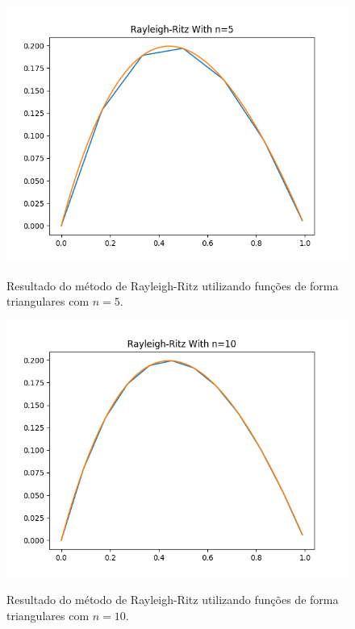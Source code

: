 \documentclass[
	12pt,				%
	openright,			%
    twoside,			%
	a4paper,			%
	english,			%
	french,				%
	spanish,			%
	brazil				%
	]{abntex2}
\numberwithin{lema}{chapter}
\numberwithin{teorema}{chapter}
\numberwithin{definicao}{chapter}
\numberwithin{exemplo}{chapter}
\numberwithin{figure}{chapter}
\begin{document}
\begin{figure}[h]
	\caption{Resultado do método de Rayleigh-Ritz utilizando funções de forma triangulares com $n=5$.}
	\centering
	\includegraphics[scale=0.6]{../figuras/code/code_plot_mrr_triangulate.png}
	\label{fig:code_plot_mrr_triangulate}
\end{figure}

\begin{figure}[h]
	\caption{Resultado do método de Rayleigh-Ritz utilizando funções de forma triangulares com $n=10$.}
	\centering
	\includegraphics[scale=0.6]{../figuras/code/code_plot_mrr_triangulate_n10.png}
	\label{fig:code_plot_mrr_triangulate_n10}
\end{figure}
\end{document}
